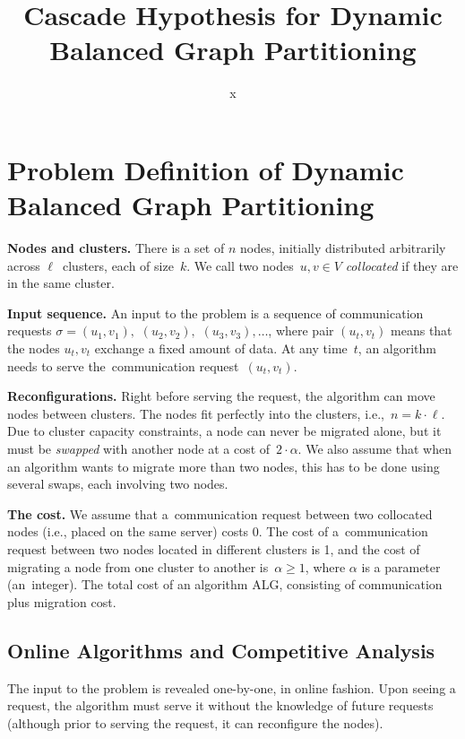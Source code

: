 \documentclass[a4paper,anonymous,USenglish]{lipics-v2019}
\title{Cascade Hypothesis for Dynamic Balanced Graph Partitioning}
\author{x}{y}{}{}{}
\newcommand{\ALG}{\textsf{ALG}\xspace}
\begin{document}
\maketitle

\section{Problem Definition of Dynamic Balanced Graph Partitioning}


\noindent
\textbf{Nodes and clusters.} There is a set of $n$ nodes, initially distributed arbitrarily
across $\ell$~clusters, each of size~$k$. We call two nodes~$u,v\in V$
\emph{collocated} if they are in the same cluster.

\noindent
\textbf{Input sequence.} An input to the problem is a sequence of communication requests $\sigma =
(u_1,v_1),$ $(u_2,v_2),$ $(u_3,v_3), \ldots$, where pair $(u_t,v_t)$ means that
the nodes $u_t,v_t$ exchange a fixed amount of data. At any time~$t
$, an algorithm needs to serve the~communication
request~$(u_t,v_t)$.


\noindent
\textbf{Reconfigurations.} Right before serving the request, the algorithm
can move nodes between clusters.
The nodes fit perfectly into the clusters,
i.e.,~$n=k\cdot \ell$. Due to cluster capacity
constraints, a node can never be migrated alone, but it must be \emph{swapped}
with another node at a cost of~$2 \cdot \alpha$. We also assume that when an
algorithm wants to migrate more than two nodes, this has to be done using
several swaps, each involving two nodes.

\noindent
\textbf{The cost.} We assume that
a~communication request between two collocated nodes (i.e., placed on the same
server) costs 0. The cost of a~communication request between two nodes located in different clusters is
1, and the cost of migrating a node from one cluster to another
is~$\alpha \geq 1$, where $\alpha$ is a parameter (an~integer). 
The total cost of an algorithm \ALG, consisting of communication plus migration
cost.

\subsection{Online Algorithms and Competitive Analysis}

The input to the problem is revealed one-by-one, in online fashion. Upon seeing
a request, the algorithm must serve it without the knowledge of future requests
(although prior to serving the request, it can reconfigure the nodes).
\end{document}
